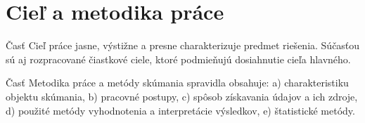 \chapter{Cieľ a metodika práce}
Časť Cieľ práce jasne, výstižne a presne charakterizuje predmet riešenia. Súčasťou sú aj rozpracované čiastkové ciele, ktoré podmieňujú dosiahnutie cieľa hlavného.

Časť Metodika práce a metódy skúmania spravidla obsahuje:
            a) charakteristiku objektu skúmania, 
            b) pracovné postupy, 
            c) spôsob získavania údajov a ich zdroje, 
            d) použité metódy vyhodnotenia a interpretácie výsledkov,
            e) štatistické metódy. 


